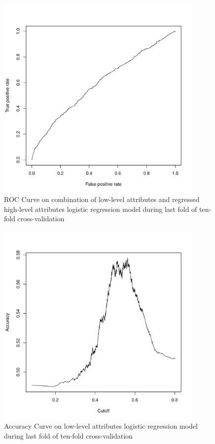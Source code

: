 \documentclass[11pt]{article}
\begin{document}
\begin{figure}[H]
  \centering
    \includegraphics[width=0.9\textwidth]{t3/roc_low_reg_hl}
    \caption{ROC Curve on combination of low-level attributes and regressed high-level attributes logistic regression model during last fold of ten-fold cross-validation}
    \label{fig:t3_roc_low_reg_hl}
\end{figure}

\begin{figure}[H]
  \centering
    \includegraphics[width=0.9\textwidth]{t3/acc_low}
    \caption{Accuracy Curve on low-level attributes logistic regression model during last fold of ten-fold cross-validation}
    \label{fig:t3_acc_low}
\end{figure}
\end{document}
